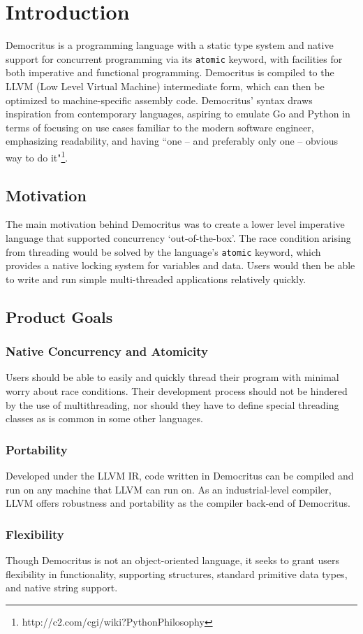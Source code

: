 \chapter{Introduction}

Democritus is a programming language with a static type system and native support for concurrent programming via its \texttt{atomic} keyword, with facilities for both imperative and functional programming. Democritus is compiled to the LLVM (Low Level Virtual Machine) intermediate form, which can then be optimized to machine-specific assembly code. Democritus' syntax draws inspiration from contemporary languages, aspiring to emulate Go and Python in terms of focusing on use cases familiar to the modern software engineer, emphasizing readability, and having ``one -- and preferably only one -- obvious way to do it"\footnote[1]{http://c2.com/cgi/wiki?PythonPhilosophy}.


\section{Motivation}

The main motivation behind Democritus was to create a lower level imperative language that supported concurrency `out-of-the-box'. The race condition arising from threading would be solved by the language's \texttt{atomic} keyword, which provides a native locking system for variables and data. Users would then be able to write and run simple multi-threaded applications relatively quickly. 

\section{Product Goals}

	\subsection{Native Concurrency and Atomicity}
		Users should be able to easily and quickly thread their program with minimal worry about race conditions. Their development process should not be hindered by the use of multithreading, nor should they have to define special threading classes as is common in some other languages.

	\subsection{Portability}
		Developed under the LLVM IR, code written in Democritus can be compiled and run on any machine that LLVM can run on. As an industrial-level compiler, LLVM offers robustness and portability as the compiler back-end of Democritus. 

	\subsection{Flexibility}
		Though Democritus is not an object-oriented language, it seeks to grant users flexibility in functionality, supporting structures, standard primitive data types, and native string support.
